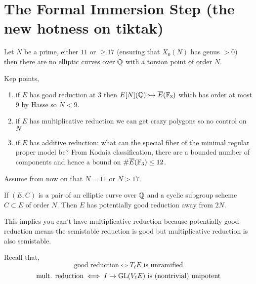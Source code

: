 \documentclass[12pt]{article}
\begin{document}
\section{The Formal Immersion Step (the new hotness on tiktak)}

\newcommand{\hatO}{\wh{\mathcal{O}}}
\newcommand{\TT}{\mathbb{T}}
\newcommand{\FFbar}{\overline{\mathbb{F}}}

\begin{theorem}
Let $N$ be a prime, either $11$ or $\ge 17$ (ensuring that $X_0(N)$ has genus $> 0$) then there are no elliptic curves over $\mathbb{Q}$ with a torsion point of order $N$. 
\end{theorem}

Kep points, 

\begin{enumerate}
\item if $E$ has good reduction at $3$ then $E[N](\mathbb{Q}) \hookrightarrow \overline{E}(\mathbb{F}_3)$ which has order at most $9$ by Hasse so $N < 9$.

\item if $E$ has multiplicative reduction we can get crazy polygons so no control on $N$

\item if $E$ has additive reduction: what can the special fiber of the minimal regular proper model be? From Kodaia classification, there are a bounded number of components and hence a bound on $\# \overline{E}(\mathbb{F}_3) \le 12$.  
\end{enumerate}
 
Assume from now on that $N = 11$ or $N > 17$. 
 
\begin{prop}
If $(E, C)$ is a pair of an elliptic curve over $\mathbb{Q}$ and a cyclic subgroup scheme $C \subset E$ of order $N$. Then $E$ has potentially good reduction away from $2N$.
\end{prop}

\begin{rmk}
This implies you can't have multiplicative reduction because potentially good reduction means the semistable reduction is good but multiplicative reduction is also semistable.
\end{rmk}

\begin{rmk}
Recall that,
\[ \text{good reduction} \iff T_\ell E \text{ is unramified} \]
\[ \text{mult. reduction} \iff I \to \mathrm{GL}(V_\ell E) \text{ is (nontrivial) unipotent} \]
\end{rmk}
\end{document}
